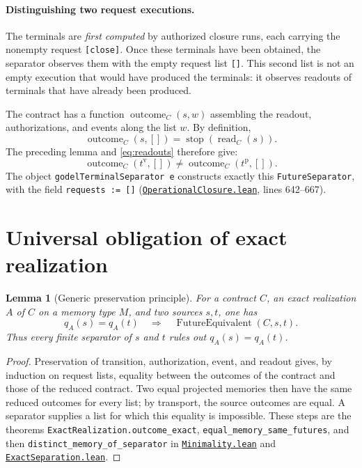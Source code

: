 \documentclass[11pt,a4paper]{article}
\newcommand{\FutureEquivalent}{\operatorname{FutureEquivalent}}
\newcommand{\code}[1]{\nolinkurl{#1}}
\newcommand{\SourceAt}[3]{\href{https://github.com/JohnDoe-collab-stack/relational-perimeter/blob/1e5aeda745559d62a3819bb3213da7fce3c31ad1/#1\#L#2}{\nolinkurl{#3}}}
\newtheorem{lemma}[theorem]{Lemma}
\theoremstyle{remark}
\begin{document}
\paragraph{Distinguishing two request executions.}
The terminals are \emph{first computed} by authorized closure runs, each
carrying the nonempty request \code{[close]}. Once these terminals have
been obtained, the separator observes them with the empty request list
\code{[]}. This second list is not an empty execution that would have
produced the terminals: it observes readouts of terminals that have already
been produced.

The contract has a function $\operatorname{outcome}_C(s,w)$ assembling the
readout, authorizations, and events along the list $w$. By definition,
\[
\operatorname{outcome}_C(s,[]) =
  \operatorname{stop}(\operatorname{read}_C(s)).
\]
The preceding lemma and \eqref{eq:readouts} therefore give:
\begin{equation}\label{eq:separator}
\operatorname{outcome}_{C}(t^{\mathrm v},[])
\neq\operatorname{outcome}_{C}(t^{\mathrm p},[]).
\end{equation}
The object \code{godelTerminalSeparator e} constructs exactly this
\code{FutureSeparator}, with the field \code{requests := []}
(\SourceAt{RelationalPerimeter/Constitution/Godel/OperationalClosure.lean}{642-L667}{OperationalClosure.lean},
lines 642--667).

\section{Universal obligation of exact realization}
\label{sec:theorem}

\begin{lemma}[Generic preservation principle]\label{lem:generic}
For a contract $C$, an exact realization $A$ of $C$ on a memory type $M$,
and two sources $s,t$, one has
\[
q_A(s)=q_A(t)\quad\Longrightarrow\quad
\FutureEquivalent(C,s,t).
\]
Thus every finite separator of $s$ and $t$ rules out $q_A(s)=q_A(t)$.
\end{lemma}
\begin{proof}
Preservation of transition, authorization, event, and readout gives, by
induction on request lists, equality between the outcomes of the contract
and those of the reduced contract. Two equal projected memories then have
the same reduced outcomes for every list; by transport, the source outcomes
are equal. A separator supplies a list for which this equality is
impossible. These steps are the theorems
\code{ExactRealization.outcome\_exact},
\code{equal\_memory\_same\_futures}, and then
\code{distinct\_memory\_of\_separator} in
\SourceAt{RelationalPerimeter/Constitution/Continuation/Minimality.lean}{56-L75}{Minimality.lean}
and \SourceAt{RelationalPerimeter/Constitution/Continuation/ExactSeparation.lean}{20-L27}{ExactSeparation.lean}.
\end{proof}
\end{document}

